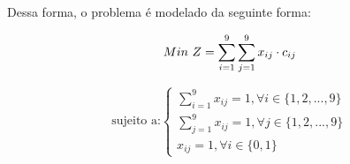 \documentclass[12pt]{article}
\begin{document}
Dessa forma, o problema é modelado da seguinte forma:

\begin{equation*}
Min\ Z = \sum_{i=1}^{9}\sum_{j=1}^{9} x_{ij} \cdot c_ {ij}\\
\end{equation*}

\begin{equation*}
\text{sujeito a:}
\begin{cases}
    \sum_{i=1}^{9} x_{ij} = 1, \forall i \in \{1,2,...,9\}\\
    \sum_{j=1}^{9} x_{ij} = 1, \forall j \in \{1,2,...,9\}\\
    x_{ij} = 1, \forall i \in \{0,1\}
\end{cases}
\end{equation*}
\end{document}
